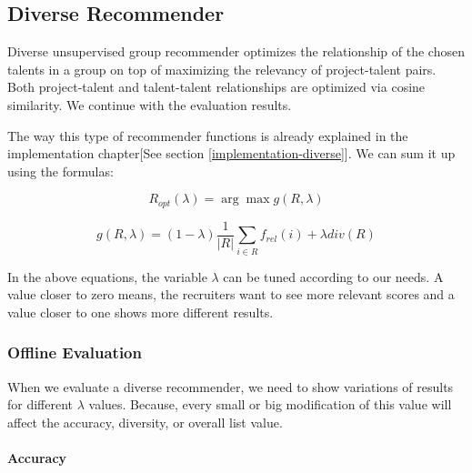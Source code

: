 \subsection{Diverse Recommender}

Diverse unsupervised group recommender optimizes the relationship of the chosen talents in a group on top of maximizing the relevancy of project-talent pairs. Both project-talent and talent-talent relationships are optimized via cosine similarity. We continue with the evaluation results.

The way this type of recommender functions is already explained in the implementation chapter[See section \ref{implementation-diverse}]. We can sum it up using the formulas:

$$
R _ { o p t } ( \lambda ) =  { \arg \max } g ( R , \lambda )
$$

$$
g ( R , \lambda ) = ( 1 - \lambda ) \frac { 1 } { | R | } \sum _ { i \in R } f _ { r e l } ( i ) + \lambda d i v ( R )
$$

In the above equations, the variable $\lambda$ can be tuned according to our needs. A value closer to zero means, the recruiters want to see more relevant scores and a value closer to one shows more different results. 

\subsubsection{Offline Evaluation}

When we evaluate a diverse recommender, we need to show variations of results for different $\lambda$ values. Because, every small or big modification of this value will affect the accuracy, diversity, or overall list value.

\paragraph{Accuracy}

